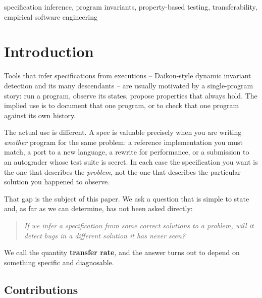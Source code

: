 \documentclass[conference]{IEEEtran}
\begin{document}
\begin{IEEEkeywords}
specification inference, program invariants, property-based testing, transferability,
empirical software engineering
\end{IEEEkeywords}

\section{Introduction}

Tools that infer specifications from executions -- Daikon-style dynamic invariant
detection and its many descendants -- are usually motivated by a single-program story: run
a program, observe its states, propose properties that always hold. The implied use is to
document that one program, or to check that one program against its own history.

The actual use is different. A spec is valuable precisely when you are writing
\emph{another} program for the same problem: a reference implementation you must match, a
port to a new language, a rewrite for performance, or a submission to an autograder whose
test suite is secret. In each case the specification you want is the one that describes the
\emph{problem}, not the one that describes the particular solution you happened to observe.

That gap is the subject of this paper. We ask a question that is simple to state and, as
far as we can determine, has not been asked directly:

\begin{quote}
\emph{If we infer a specification from some correct solutions to a problem, will it detect
bugs in a different solution it has never seen?}
\end{quote}

We call the quantity \textbf{transfer rate}, and the answer turns out to depend on
something specific and diagnosable.

\subsection{Contributions}
\end{document}
